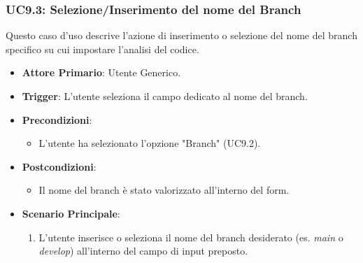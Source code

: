 \documentclass[12pt, a4paper]{article}
\begin{document}
\subsubsection{UC9.3: Selezione/Inserimento del nome del Branch}\label{uc:9.3}
Questo caso d'uso descrive l'azione di inserimento o selezione del nome del branch specifico su cui impostare l'analisi del codice.
\begin{itemize}
    \item \textbf{Attore Primario}: Utente Generico.
    \item \textbf{Trigger}: L'utente seleziona il campo dedicato al nome del branch.
    \item \textbf{Precondizioni}:\begin{itemize}\item L'utente ha selezionato l'opzione "Branch" (UC9.2).\end{itemize}
    \item \textbf{Postcondizioni}:\begin{itemize}\item Il nome del branch è stato valorizzato all'interno del form.\end{itemize}
    \item \textbf{Scenario Principale}:
    \begin{enumerate}
        \item L'utente inserisce o seleziona il nome del branch desiderato (es. \textit{main} o \textit{develop}) all'interno del campo di input preposto.
    \end{enumerate}
\end{itemize}

\newpage
\end{document}
